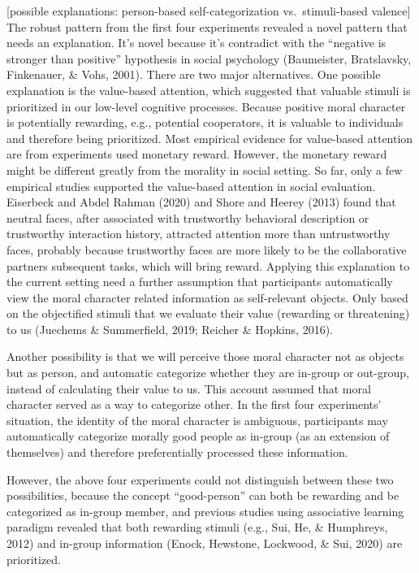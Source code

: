 \documentclass[
  english,
  man]{apa6}
\begin{document}
{[}possible explanations: person-based self-categorization vs.~stimuli-based valence{]} The robust pattern from the first four experiments revealed a novel pattern that needs an explanation. It's novel because it's contradict with the ``negative is stronger than positive'' hypothesis in social psychology (Baumeister, Bratslavsky, Finkenauer, \& Vohs, 2001). There are two major alternatives. One possible explanation is the value-based attention, which suggested that valuable stimuli is prioritized in our low-level cognitive processes. Because positive moral character is potentially rewarding, e.g., potential cooperators, it is valuable to individuals and therefore being prioritized. Most empirical evidence for value-based attention are from experiments used monetary reward. However, the monetary reward might be different greatly from the morality in social setting. So far, only a few empirical studies supported the value-based attention in social evaluation. Eiserbeck and Abdel Rahman (2020) and Shore and Heerey (2013) found that neutral faces, after associated with trustworthy behavioral description or trustworthy interaction history, attracted attention more than untrustworthy faces, probably because trustworthy faces are more likely to be the collaborative partners subsequent tasks, which will bring reward. Applying this explanation to the current setting need a further assumption that participants automatically view the moral character related information as self-relevant objects. Only based on the objectified stimuli that we evaluate their value (rewarding or threatening) to us (Juechems \& Summerfield, 2019; Reicher \& Hopkins, 2016).

Another possibility is that we will perceive those moral character not as objects but as person, and automatic categorize whether they are in-group or out-group, instead of calculating their value to us. This account assumed that moral character served as a way to categorize other. In the first four experiments' situation, the identity of the moral character is ambiguous, participants may automatically categorize morally good people as in-group (as an extension of themselves) and therefore preferentially processed these information.

However, the above four experiments could not distinguish between these two possibilities, because the concept ``good-person'' can both be rewarding and be categorized as in-group member, and previous studies using associative learning paradigm revealed that both rewarding stimuli (e.g., Sui, He, \& Humphreys, 2012) and in-group information (Enock, Hewstone, Lockwood, \& Sui, 2020) are prioritized.
\end{document}
